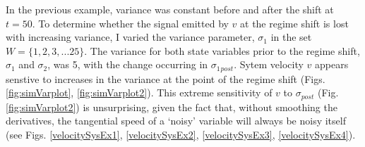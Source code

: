 \documentclass[12pt,twoside,openany]{reedthesis}
\newenvironment{Shaded}{\begin{snugshade}}{\end{snugshade}}
\newcommand{\KeywordTok}[1]{\textcolor[rgb]{0.13,0.29,0.53}{\textbf{#1}}}
\newcommand{\DataTypeTok}[1]{\textcolor[rgb]{0.13,0.29,0.53}{#1}}
\newcommand{\DecValTok}[1]{\textcolor[rgb]{0.00,0.00,0.81}{#1}}
\newcommand{\StringTok}[1]{\textcolor[rgb]{0.31,0.60,0.02}{#1}}
\newcommand{\OperatorTok}[1]{\textcolor[rgb]{0.81,0.36,0.00}{\textbf{#1}}}
\newcommand{\NormalTok}[1]{#1}
\begin{document}
In the previous example, variance was constant before and after the
shift at \(t=50\). To determine whether the signal emitted by \(v\) at
the regime shift is lost with increasing variance, I varied the variance
parameter, \(\sigma_1\) in the set \(W = \{1,2,3,...25 \}\). The
variance for both state variables prior to the regime shift,
\(\sigma_1\) and \(\sigma_2\), was 5, with the change occurring in
\(\sigma_1{_{post}}\). Sytem velocity \(v\) appears senstive to
increases in the variance at the point of the regime shift (Figs.
\ref{fig:simVarplot}, \ref{fig:simVarplot2}). This extreme sensitivity
of \(v\) to \(\sigma{_{post}}\) (Fig. \ref{fig:simVarplot2}) is
unsurprising, given the fact that, without smoothing the derivatives,
the tangential speed of a `noisy' variable will always be noisy itself
(see Figs. \ref{velocitySysEx1}, \ref{velocitySysEx2},
\ref{velocitySysEx3}, \ref{velocitySysEx4}).
\begin{Shaded}
\end{Shaded}
\end{document}
